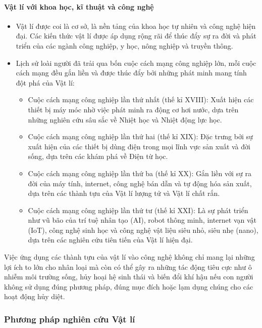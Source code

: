 \paragraph{Vật lí với khoa học, kĩ thuật và công nghệ}
\begin{itemize}
\item Vật lí được coi là cơ sở, là nền tảng của khoa học tự nhiên và công nghệ hiện đại. Các kiến thức vật lí được áp dụng rộng rãi để thúc đẩy sự ra đời và phát triển của các ngành công nghiệp, y học, nông nghiệp và truyền thông.
\item Lịch sử loài người đã trải qua bốn cuộc cách mạng công nghiệp lớn, mỗi cuộc cách mạng đều gắn liền và được thúc đẩy bởi những phát minh mang tính đột phá của Vật lí:
\begin{itemize}
\item Cuộc cách mạng công nghiệp lần thứ nhất (thế kỉ XVIII): Xuất hiện các thiết bị máy móc nhờ việc phát minh ra động cơ hơi nước, dựa trên những nghiên cứu sâu sắc về Nhiệt học và Nhiệt động lực học.
\item Cuộc cách mạng công nghiệp lần thứ hai (thế kỉ XIX): Đặc trưng bởi sự xuất hiện của các thiết bị dùng điện trong mọi lĩnh vực sản xuất và đời sống, dựa trên các khám phá về Điện từ học.
\item Cuộc cách mạng công nghiệp lần thứ ba (thế kỉ XX): Gắn liền với sự ra đời của máy tính, internet, công nghệ bán dẫn và tự động hóa sản xuất, dựa trên các thành tựu của Vật lí lượng tử và Vật lí chất rắn.
\item Cuộc cách mạng công nghiệp lần thứ tư (thế kỉ XXI): Là sự phát triển như vũ bão của trí tuệ nhân tạo (AI), robot thông minh, internet vạn vật (IoT), công nghệ sinh học và công nghệ vật liệu siêu nhỏ, siêu nhẹ (nano), dựa trên các nghiên cứu tiên tiến của Vật lí hiện đại.
\end{itemize}
\end{itemize}
\begin{emcobiet}
Việc ứng dụng các thành tựu của vật lí vào công nghệ không chỉ mang lại những lợi ích to lớn cho nhân loại mà còn có thể gây ra những tác động tiêu cực như ô nhiễm môi trường sống, hủy hoại hệ sinh thái và biến đổi khí hậu nếu con người không sử dụng đúng phương pháp, đúng mục đích hoặc lạm dụng chúng cho các hoạt động hủy diệt.
\end{emcobiet}

\subsubsection{Phương pháp nghiên cứu Vật lí}
